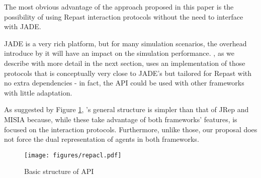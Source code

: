 The most obvious advantage of the approach proposed in this paper is the possibility of using Repast interaction protocols without the need to interface with JADE.

JADE is a very rich platform, but for many simulation scenarios, the overhead introduce by it will have an impact on the simulation performance. \cite{mengistu2008scalability} \apiname{}, as we describe with more detail in the next section, uses an implementation of those protocols that is conceptually very close to JADE's but tailored for Repast with no extra dependencies - in fact, the API could be used with other frameworks with little adaptation.

As suggested by Figure \ref{fig:related-repacl}, \apiname{}'s general structure is simpler than that of JRep and MISIA because, while these take advantage of both frameworks' features, \apiname{} is focused on the interaction protocols. Furthermore, unlike those, our proposal does not force the dual representation of agents in both frameworks.

\begin{figure}[h]
	\centering
	\texttt{[image: figures/repacl.pdf]}
	\caption{Basic structure of \apiname{} API}
	\label{fig:related-repacl}
\end{figure}
